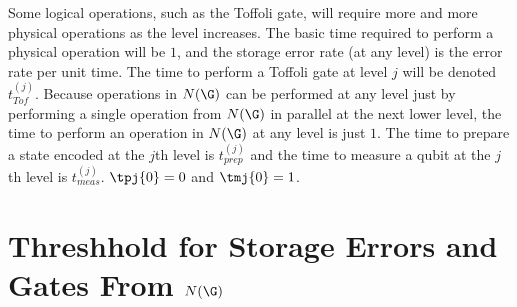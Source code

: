 Some logical operations, such as the Toffoli gate, will require more and
more physical operations as the level increases.  The basic time required to
perform a physical operation will be $1$, and the storage error rate (at any
level) is the error rate per unit time.  The time to perform a Toffoli gate at
level $j$ will be denoted $t_{Tof}^{(j)}$.  Because operations in $N(\G)$ can
be performed at any level just by performing a single operation from
$N(\G)$ in parallel at the next lower level, the time to perform an
operation in $N(\G)$ at any level is just $1$.  The time to prepare a state
encoded at the $j$th level is $t_{prep}^{(j)}$ and the time to measure a
qubit at the $j$th level is $t_{meas}^{(j)}$.  $\tpj{0} = 0$ and $\tmj{0} = 1$.

\section{Threshhold for Storage Errors and Gates From $N(\G)$}


